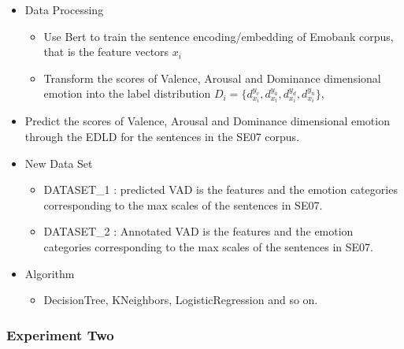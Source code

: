 \begin{itemize}
	\item
	Data Processing
	
	\begin{itemize}
		\item 
		Use Bert to train the sentence encoding/embedding
		of Emobank corpus, that is the feature vectors $ x_{i} $
		\item 
		Transform the scores of Valence, Arousal and Dominance 
		dimensional emotion into 
		the label distribution 
		$ D_{i} = \{d^{y_{v}}_{x_{i}},  d^{y_{a}}_{x_{i}}, d^{y_{d}}_{x_{i}}, d^{y_{n}}_{x_{i}}\} $,
	\end{itemize}
	
	\item 
	Predict the scores of 
	Valence, Arousal and Dominance dimensional emotion
	through the EDLD
	for the sentences in the SE07 corpus.
	
	\item 
	New Data Set
	
	\begin{itemize}
		\item 
		DATASET_1 : predicted VAD is the features and 
		the emotion categories corresponding to 
		the max scales of the sentences in SE07.
		\item 
		DATASET_2 : Annotated VAD is the features and 
		the emotion categories corresponding to 
		the max scales of the sentences in SE07.
	\end{itemize}
	
	\item 
	Algorithm
	
	\begin{itemize}
		\item DecisionTree, KNeighbors, LogisticRegression and so on.
		
	\end{itemize}
\end{itemize}



\subsubsection{Experiment Two}
\


